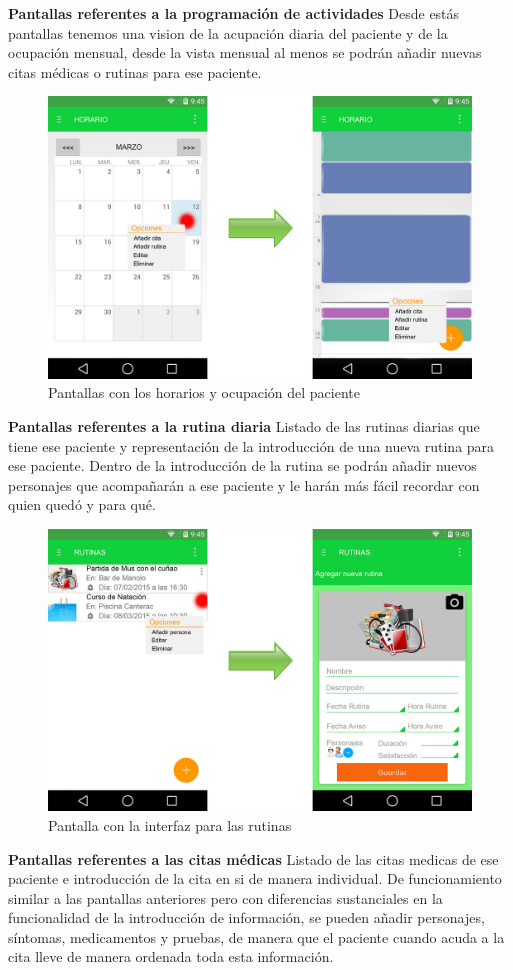 \documentclass[../pfc.tex]{subfiles}
\begin{document}
			
			\textbf{Pantallas referentes a la programación de actividades}
			Desde estás pantallas tenemos una vision de la acupación diaria del paciente y de la ocupación mensual, desde la vista mensual al menos se podrán añadir nuevas citas médicas o rutinas para ese paciente.

			
			\begin{figure}
				\centering
				\includegraphics[width=0.7\linewidth]{../images/horario_2}
				\caption{Pantallas con los horarios y ocupación del paciente}
				\label{fig:horario_2}
			\end{figure}
			
			
			\textbf{Pantallas referentes a la rutina diaria}
			Listado de las rutinas diarias que tiene ese paciente y representación de la introducción de una nueva rutina para ese paciente.
			Dentro de la introducción de la rutina se podrán añadir nuevos personajes que acompañarán a ese paciente y le harán más fácil recordar con quien quedó y para qué.

			
			\begin{figure}
				\centering
				\includegraphics[width=0.7\linewidth]{../images/rutina}
				\caption{Pantalla con la interfaz para las rutinas}
				\label{fig:rutina}
			\end{figure}
						
			
			\textbf{Pantallas referentes a las citas médicas}
			Listado de las citas medicas de ese paciente e introducción de la cita en si de manera individual.
			De funcionamiento similar a las pantallas anteriores pero con diferencias sustanciales en la funcionalidad de la introducción de información, se pueden añadir personajes, síntomas, medicamentos y pruebas, de manera que el paciente cuando acuda a la cita lleve de manera ordenada toda esta información.
			
\end{document}
